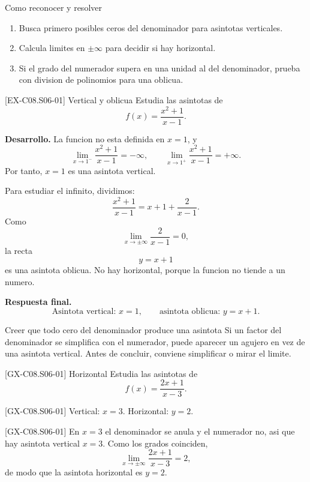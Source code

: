 \begin{methodbox}{Como reconocer y resolver}
\begin{enumerate}
  \item Busca primero posibles ceros del denominador para asintotas verticales.
  \item Calcula limites en \(\pm\infty\) para decidir si hay horizontal.
  \item Si el grado del numerador supera en una unidad al del denominador, prueba con division
  de polinomios para una oblicua.
\end{enumerate}
\end{methodbox}

\begin{solvedexample}{[EX-C08.S06-01] Vertical y oblicua}
Estudia las asintotas de
\[
f(x)=\frac{x^2+1}{x-1}.
\]

\textbf{Desarrollo.} La funcion no esta definida en \(x=1\), y
\[
\lim_{x\to 1^-}\frac{x^2+1}{x-1}=-\infty,\qquad
\lim_{x\to 1^+}\frac{x^2+1}{x-1}=+\infty.
\]
Por tanto, \(x=1\) es una asintota vertical.

Para estudiar el infinito, dividimos:
\[
\frac{x^2+1}{x-1}=x+1+\frac{2}{x-1}.
\]
Como
\[
\lim_{x\to\pm\infty}\frac{2}{x-1}=0,
\]
la recta
\[
y=x+1
\]
es una asintota oblicua. No hay horizontal, porque la funcion no tiende a un numero.

\textbf{Respuesta final.}
\[
\text{Asintota vertical: }x=1,
\qquad
\text{asintota oblicua: }y=x+1.
\]
\end{solvedexample}

\begin{commonerror}{Creer que todo cero del denominador produce una asintota}
Si un factor del denominador se simplifica con el numerador, puede aparecer un agujero en vez de
una asintota vertical. Antes de concluir, conviene simplificar o mirar el limite.
\end{commonerror}

\begin{guidedexercise}{[GX-C08.S06-01] Horizontal}
Estudia las asintotas de
\[
f(x)=\frac{2x+1}{x-3}.
\]
\end{guidedexercise}

\begin{shortanswer}{[GX-C08.S06-01]}
Vertical: \(x=3\). Horizontal: \(y=2\).
\end{shortanswer}

\begin{fullsolution}{[GX-C08.S06-01]}
En \(x=3\) el denominador se anula y el numerador no, asi que hay asintota vertical \(x=3\).
Como los grados coinciden,
\[
\lim_{x\to\pm\infty}\frac{2x+1}{x-3}=2,
\]
de modo que la asintota horizontal es \(y=2\).
\end{fullsolution}

